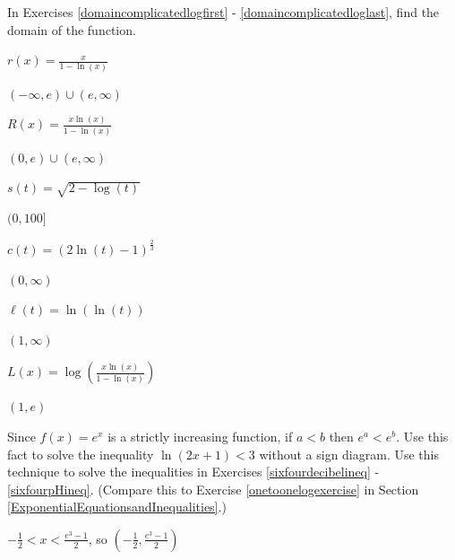 \documentclass{ximera}
\begin{document}
\begin{question}
In Exercises \ref{domaincomplicatedlogfirst} - \ref{domaincomplicatedloglast},  find the domain of the function.

\begin{problem}\label{domaincomplicatedlogfirst}
$r(x) =   \frac{x}{1 - \ln(x)}$

\begin{solution}
$(-\infty, e) \cup (e, \infty)$
\end{solution}
\end{problem}    

\begin{problem}
$R(x) = \frac{x \ln(x)}{1 - \ln(x)}$ 

\begin{solution}
$(0,e) \cup (e, \infty)$
\end{solution}
\end{problem}     

\begin{problem}
$s(t) = \sqrt{2 - \log(t)}$

\begin{solution}
$(0, 100]$
\end{solution}
\end{problem}

\begin{problem}
$c(t) =  (2 \ln(t) -1)^{\frac{2}{3}}$

\begin{solution}
$(0, \infty)$
\end{solution}
\end{problem}
    

\begin{problem}
$\ell(t) = \ln( \ln(t))$


\begin{solution}
$(1, \infty)$
\end{solution}
\end{problem}
  
\begin{problem}\label{domaincomplicatedloglast}
$L(x) = \log\left( \frac{x \ln(x)}{1 - \ln(x)} \right)$

\begin{solution}
$(1,e)$
\end{solution}
\end{problem}
\end{question}

\begin{problem}\label{onetooneexpexercise}
Since $f(x) = e^{x}$ is a strictly increasing function, if $a < b$ then $e^{a} < e^{b}$.  Use this fact to solve the inequality $\ln(2x + 1) < 3$ without a sign diagram. Use this technique to solve the inequalities in Exercises \ref{sixfourdecibelineq} - \ref{sixfourpHineq}. (Compare this to Exercise  \ref{onetoonelogexercise} in Section \ref{ExponentialEquationsandInequalities}.)

\begin{solution}
$-\frac{1}{2} < x < \frac{e^{3} - 1}{2}$, so $\left( -\frac{1}{2}, \frac{e^{3} - 1}{2}\right)$
\end{solution}
\end{problem} 
\end{document}
